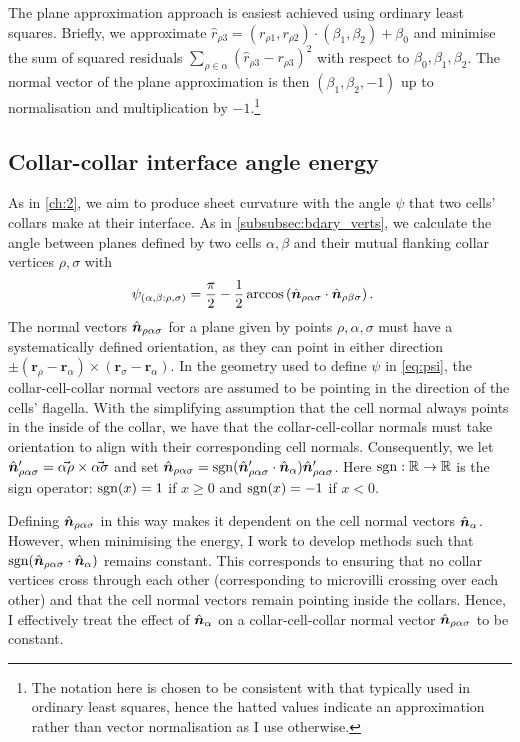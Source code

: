 The plane approximation approach is easiest achieved using ordinary least squares. 
Briefly, we approximate $\hat{r}_{\rho 3} = (r_{\rho 1}, r_{\rho 2}) \cdot (\beta_1, \beta_2) + \beta_0$ and minimise the sum of squared residuals $\sum_{\rho\in\alpha} (\hat{r}_{\rho 3} - r_{\rho 3})^2$ with respect to $\beta_0, \beta_1, \beta_2$. 
The normal vector of the plane approximation is then $(\beta_1, \beta_2, -1)$ up to normalisation and multiplication by $-1$.\footnote{The notation here is chosen to be consistent with that typically used in ordinary least squares, hence the hatted values indicate an approximation rather than vector normalisation as I use otherwise.} 

\subsection{Collar-collar interface angle energy} \label{subsec:e_psi}

As in \cref{ch:2}, we aim to produce sheet curvature with the angle $\psi$ that two cells' collars make at their interface. As in \cref{subsubsec:bdary_verts}, we calculate the angle between planes defined by two cells $\alpha, \beta$ and their mutual flanking collar vertices $\rho, \sigma$ with
\begin{align}
	\psi_{(\alpha, \beta: \rho, \sigma)} &= \frac{\pi}{2} - \frac{1}{2}\arccos \left(\hat{\bm{n}}_{\rho\alpha\sigma} \cdot \hat{\bm{n}}_{\rho\beta\sigma} \right). \label{eq:psi}
\end{align}
\noindent The normal vectors $\hat{\bm{n}}_{\rho\alpha\sigma}$ for a plane given by points $\rho, \alpha, \sigma$ must have a systematically defined orientation, as they can point in either direction $\pm (\bm{r}_\rho - \bm{r}_\alpha) \times (\bm{r}_\sigma - \bm{r}_\alpha)$. 
In the geometry used to define $\psi$ in \cref{eq:psi}, the collar-cell-collar normal vectors are assumed to be pointing in the direction of the cells' flagella. 
With the simplifying assumption that the cell normal always points in the inside of the collar, we have that the collar-cell-collar normals must take orientation to align with their corresponding cell normals. 
Consequently, we let $\hat{\bm{n}}_{\rho\alpha\sigma}' = \vec{\alpha\rho} \times \vec{\alpha\sigma}$ and set $\hat{\bm{n}}_{\rho\alpha\sigma} = \operatorname{sgn} (\hat{\bm{n}}_{\rho\alpha\sigma}' \cdot \hat{\bm{n}}_\alpha) \hat{\bm{n}}_{\rho\alpha\sigma}'$.
Here $\operatorname{sgn}: \mathbb{R} \to \mathbb{R}$ is the sign operator: $\operatorname{sgn}(x) = 1$ if $x \geq 0$ and $\operatorname{sgn}(x) = -1$ if $x < 0$.

Defining $\hat{\bm{n}}_{\rho\alpha\sigma}$ in this way makes it dependent on the cell normal vectors $\hat{\bm{n}}_\alpha$. 
However, when minimising the energy, I work to develop methods such that $\operatorname{sgn} (\hat{\bm{n}}_{\rho\alpha\sigma} \cdot \hat{\bm{n}}_\alpha)$ remains constant. 
This corresponds to ensuring that no collar vertices cross through each other (corresponding to microvilli crossing over each other) and that the cell normal vectors remain pointing inside the collars.
Hence, I effectively treat the effect of $\hat{\bm{n}}_\alpha$ on a collar-cell-collar normal vector $\hat{\bm{n}}_{\rho\alpha\sigma}$ to be constant.

